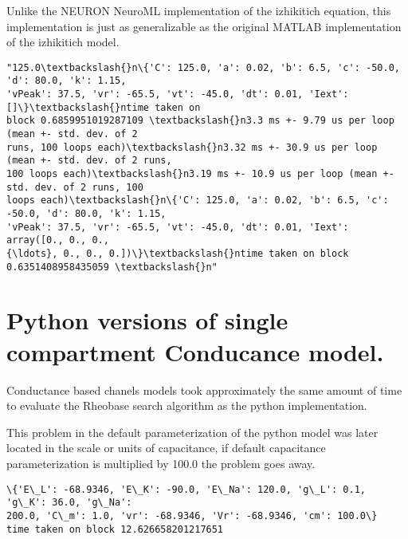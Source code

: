 \documentclass[11pt]{article}
\begin{document}
Unlike the NEURON NeuroML implementation of the izhikitich equation,
this implementation is just as generalizable as the original MATLAB
implementation of the izhikitich model.

            \begin{tcolorbox}[breakable, size=fbox, boxrule=.5pt, pad at break*=1mm, opacityfill=0]
\begin{Verbatim}[commandchars=\\\{\}]
"125.0\textbackslash{}n\{'C': 125.0, 'a': 0.02, 'b': 6.5, 'c': -50.0, 'd': 80.0, 'k': 1.15,
'vPeak': 37.5, 'vr': -65.5, 'vt': -45.0, 'dt': 0.01, 'Iext': []\}\textbackslash{}ntime taken on
block 0.6859951019287109 \textbackslash{}n3.3 ms +- 9.79 us per loop (mean +- std. dev. of 2
runs, 100 loops each)\textbackslash{}n3.32 ms +- 30.9 us per loop (mean +- std. dev. of 2 runs,
100 loops each)\textbackslash{}n3.19 ms +- 10.9 us per loop (mean +- std. dev. of 2 runs, 100
loops each)\textbackslash{}n\{'C': 125.0, 'a': 0.02, 'b': 6.5, 'c': -50.0, 'd': 80.0, 'k': 1.15,
'vPeak': 37.5, 'vr': -65.5, 'vt': -45.0, 'dt': 0.01, 'Iext': array([0., 0., 0.,
{\ldots}, 0., 0., 0.])\}\textbackslash{}ntime taken on block 0.6351408958435059 \textbackslash{}n"
\end{Verbatim}
\end{tcolorbox}
        
    \hypertarget{python-versions-of-single-compartment-conducance-model.}{%
\section{Python versions of single compartment Conducance
model.}\label{python-versions-of-single-compartment-conducance-model.}}

Conductance based chanels models took approximately the same amount of
time to evaluate the Rheobase search algorithm as the python
implementation.

This problem in the default parameterization of the python model was
later located in the scale or units of capacitance, if default
capacitance parameterization is multiplied by 100.0 the problem goes
away.

    \begin{Verbatim}[commandchars=\\\{\}]
\{'E\_L': -68.9346, 'E\_K': -90.0, 'E\_Na': 120.0, 'g\_L': 0.1, 'g\_K': 36.0, 'g\_Na':
200.0, 'C\_m': 1.0, 'vr': -68.9346, 'Vr': -68.9346, 'cm': 100.0\}
time taken on block 12.626658201217651
    \end{Verbatim}
\end{document}
